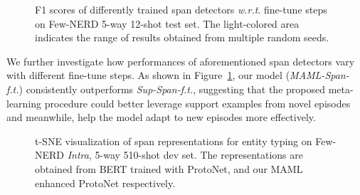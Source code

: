\documentclass[11pt]{article}
\newcommand\wrt{\textit{w.r.t}}
\begin{document}
\begin{figure}[t]
  \centering
  \caption{F1 scores of differently trained span detectors \wrt. fine-tune steps on Few-NERD 5-way 12-shot test set. The light-colored area indicates the range of results obtained from multiple random seeds.
}
  \label{fig:analysis_finetune_steps}
\end{figure}
We further investigate how performances of aforementioned span detectors vary with different fine-tune steps.
As shown in Figure~\ref{fig:analysis_finetune_steps},
our model (\textit{MAML-Span-f.t.}) consistently outperforms \textit{Sup-Span-f.t.}, suggesting that the proposed meta-learning procedure could better leverage support examples from novel episodes and meanwhile, help the model adapt to new episodes more effectively.

\begin{table}[t]
    \centering
    \caption{Analysis on entity typing under Few-NERD 5-way 12-shot setting. F1 scores are reported. \textbf{Ours w/ ProtoNet}: built upon the same span detection model as \textit{Ours}, directly leverage ProtoNet for inference.}
    \label{tab:analysis_proto}
\end{table}
\begin{figure}[t]
  \centering
  \caption{t-SNE visualization of span representations for entity typing on  Few-NERD \textit{Intra}, 5-way 510-shot dev set. The representations are obtained from BERT trained with ProtoNet, and our MAML enhanced ProtoNet respectively.}
  \label{fig:analysis_proto}
\end{figure}
\end{document}
